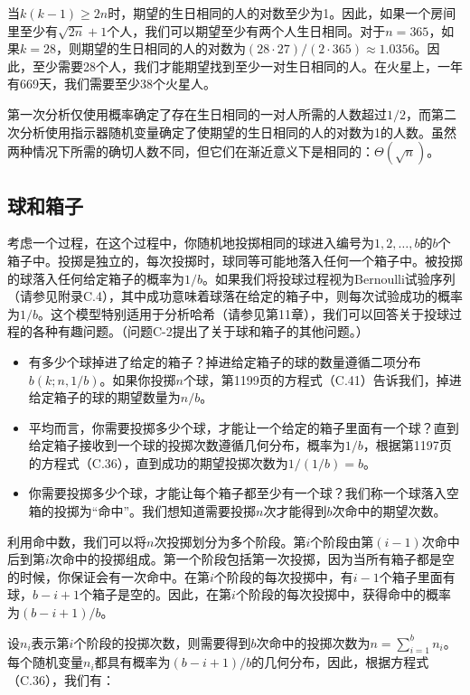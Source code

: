 \documentclass[lang=cn,newtx,10pt,scheme=chinese]{elegantbook}
\begin{document}
当$k(k-1)\geq 2n$时，期望的生日相同的人的对数至少为1。因此，如果一个房间里至少有$\sqrt{2n}+1$个人，我们可以期望至少有两个人生日相同。对于$n=365$，如果$k=28$，则期望的生日相同的人的对数为$(28\cdot 27)/(2\cdot 365)\approx 1.0356$。因此，至少需要28个人，我们才能期望找到至少一对生日相同的人。在火星上，一年有669天，我们需要至少38个火星人。

第一次分析仅使用概率确定了存在生日相同的一对人所需的人数超过$1/2$，而第二次分析使用指示器随机变量确定了使期望的生日相同的人的对数为1的人数。虽然两种情况下所需的确切人数不同，但它们在渐近意义下是相同的：$\Theta(\sqrt{n})$。

\subsection{球和箱子}

考虑一个过程，在这个过程中，你随机地投掷相同的球进入编号为$1,2,\ldots,b$的$ b $个箱子中。投掷是独立的，每次投掷时，球同等可能地落入任何一个箱子中。被投掷的球落入任何给定箱子的概率为$1/b$。如果我们将投球过程视为Bernoulli试验序列（请参见附录C.4），其中成功意味着球落在给定的箱子中，则每次试验成功的概率为$1/b$。这个模型特别适用于分析哈希（请参见第11章），我们可以回答关于投球过程的各种有趣问题。（问题C-2提出了关于球和箱子的其他问题。）

\begin{itemize}
\item 有多少个球掉进了给定的箱子？掉进给定箱子的球的数量遵循二项分布$b(k;n,1/b)$。如果你投掷$n$个球，第1199页的方程式（C.41）告诉我们，掉进给定箱子的球的期望数量为$n/b$。
\item 平均而言，你需要投掷多少个球，才能让一个给定的箱子里面有一个球？直到给定箱子接收到一个球的投掷次数遵循几何分布，概率为$1/b$，根据第1197页的方程式（C.36），直到成功的期望投掷次数为$1/(1/b)=b$。
\item 你需要投掷多少个球，才能让每个箱子都至少有一个球？我们称一个球落入空箱的投掷为“命中”。我们想知道需要投掷$n$次才能得到$b$次命中的期望次数。
\end{itemize}

利用命中数，我们可以将$n$次投掷划分为多个阶段。第$i$个阶段由第$(i-1)$次命中后到第$i$次命中的投掷组成。第一个阶段包括第一次投掷，因为当所有箱子都是空的时候，你保证会有一次命中。在第$i$个阶段的每次投掷中，有$i-1$个箱子里面有球，$b-i+1$个箱子是空的。因此，在第$i$个阶段的每次投掷中，获得命中的概率为$(b-i+1)/b$。

设$n_i$表示第$i$个阶段的投掷次数，则需要得到$b$次命中的投掷次数为$n=\sum_{i=1}^b n_i$。每个随机变量$n_i$都具有概率为$(b-i+1)/b$的几何分布，因此，根据方程式（C.36），我们有：
\end{document}
